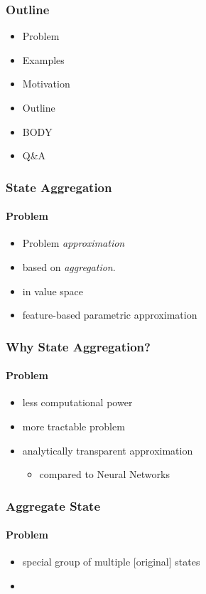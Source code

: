 \documentclass{beamer}
\begin{document}
\begin{frame}
    \frametitle{Outline}

    \begin{itemize}
        \item Problem
        \item Examples
        \item Motivation
        \item Outline
        \item BODY
        \item Q&A
    \end{itemize}
\end{frame}


\begin{frame}
    \frametitle{State Aggregation}
    \label{fm:sta}
    \framesubtitle{Problem}
    
    \begin{itemize}
        \item Problem \textit{approximation} 
        \item based on \textit{aggregation}.
        \item in value space
        \item feature-based parametric approximation
    \end{itemize}
 
\end{frame}




\begin{frame}
    \frametitle{Why State Aggregation?}
    \framesubtitle{Problem}

    \begin{itemize}
        \item less computational power
        \item more tractable problem
        \item analytically transparent approximation
            \begin{itemize}
                \item compared to Neural Networks
            \end{itemize}
    \end{itemize}
    
    
\end{frame}


\begin{frame}
    \frametitle{Aggregate State}
    \framesubtitle{Problem}

    \begin{itemize}
        \item special group of multiple [original] states
        \item 
    \end{itemize}
    
\end{frame}
\end{document}
